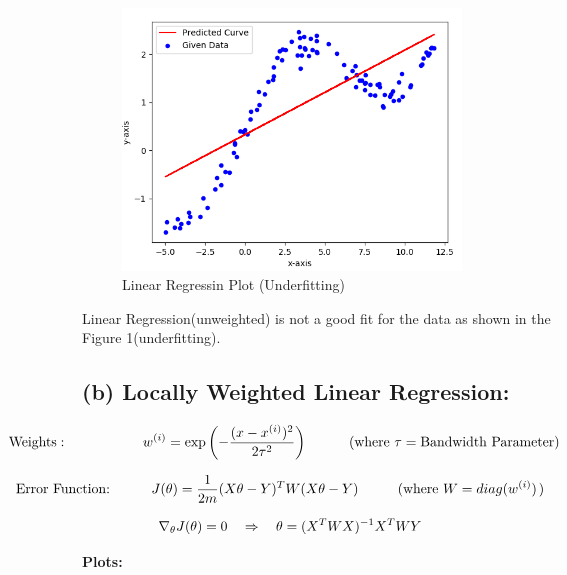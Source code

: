 \documentclass[a4 paper]{article}
\begin{document}
\vspace*{-0.2cm}
\begin{figure}[H]
	\centering
	\includegraphics[width = 90mm]{./Plots/2a.png}
	\caption{Linear Regressin Plot (Underfitting)}
  	\label{fig1}
\end{figure}

Linear Regression(unweighted) is not a good fit for the data as shown in the Figure 1(underfitting).

\subsection*{(b) Locally Weighted Linear Regression:}
\vspace*{0.3cm}
$$ \hspace*{-2.5cm}\text{Weights}: \hspace*{1.9cm} w^{(i)} = \exp\left(-\frac{(x-x^{(i)})^2}{2\tau^2}\right) \quad \quad \quad (\text{where } \tau = \text{Bandwidth Parameter}) $$

$$ \hspace*{-2.7cm} \text{Error Function: } \hspace*{0.9cm} J(\theta) = \frac{1}{2m} (X\theta - Y)^TW(X\theta - Y) \hspace*{1cm} (\text{where } W = diag(w^{(i)}) \hspace*{0.5mm}) $$


$$ \hspace*{-5.8cm} \text{Minima:} \hspace*{2.3cm} \nabla_{\theta}J(\theta) = 0 \quad \Rightarrow \quad \theta = (X^TWX)^{-1}X^TWY $$

\vspace*{0.1cm}
\hspace*{-0.2cm}
\textbf{Plots:}
\end{document}
